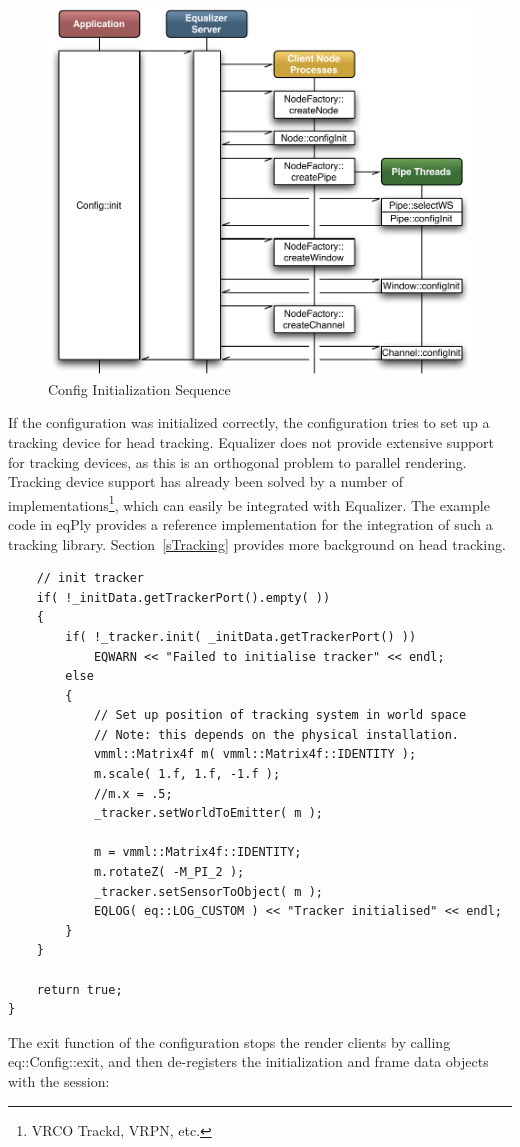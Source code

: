 \documentclass[10pt,a4]{scrartcl}
\newcommand{\sref}[1]{Section~\ref{#1}}
\begin{document}
\begin{figure}
  \includegraphics[width=.618\textwidth]{images/configInit.pdf}
  {\caption{\small\label{fConfigInit}Config Initialization Sequence}}
\end{figure}
If the configuration was initialized correctly, the configuration tries
to set up a tracking device for head tracking. Equalizer does not
provide extensive support for tracking devices, as this is an orthogonal
problem to parallel rendering. Tracking device support has already been
solved by a number of implementations\footnote{VRCO Trackd, VRPN, etc.},
which can easily be integrated with Equalizer. The example code in
\textsf{eqPly} provides a reference implementation for the integration
of such a tracking library. \sref{sTracking} provides more background on
head tracking.

{\footnotesize\begin{lstlisting}
    // init tracker
    if( !_initData.getTrackerPort().empty( ))
    {
        if( !_tracker.init( _initData.getTrackerPort() ))
            EQWARN << "Failed to initialise tracker" << endl;
        else
        {
            // Set up position of tracking system in world space
            // Note: this depends on the physical installation.
            vmml::Matrix4f m( vmml::Matrix4f::IDENTITY );
            m.scale( 1.f, 1.f, -1.f );
            //m.x = .5;
            _tracker.setWorldToEmitter( m );

            m = vmml::Matrix4f::IDENTITY;
            m.rotateZ( -M_PI_2 );
            _tracker.setSensorToObject( m );
            EQLOG( eq::LOG_CUSTOM ) << "Tracker initialised" << endl;
        }
    }

    return true;
}
\end{lstlisting}}%

The exit function of the configuration stops the render clients by calling
\textsf{eq::Con\-fig::exit}, and then de-registers the initialization and
frame data objects with the session:
\end{document}

